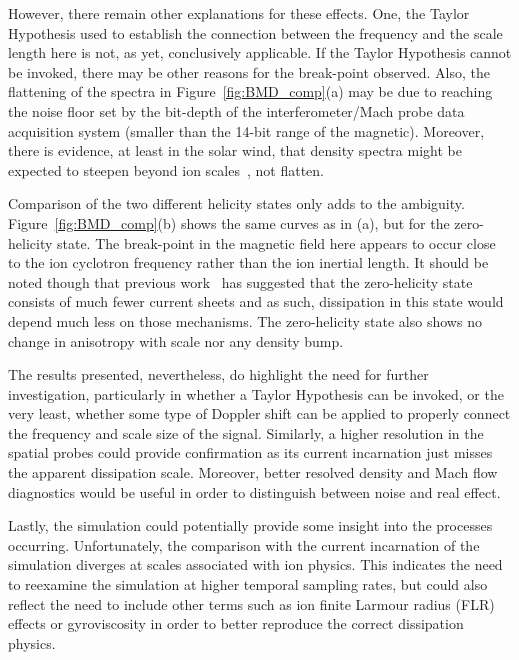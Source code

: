 \documentclass[aip,prl,amsmath,amssymb,reprint,superscriptaddress]{revtex4-1} %
\begin{document}
However, there remain other explanations for these effects. One, the Taylor Hypothesis used to establish the connection between the frequency and the scale length here is not, as yet, conclusively applicable. If the Taylor Hypothesis cannot be invoked, there may be other reasons for the break-point observed. Also, the flattening of the spectra in Figure~\ref{fig:BMD_comp}(a) may be due to reaching the noise floor set by the bit-depth of the interferometer/Mach probe data acquisition system (smaller than the 14-bit range of the magnetic). Moreover, there is evidence, at least in the solar wind, that density spectra might be expected to steepen beyond ion scales~\cite{chen12}, not flatten.

Comparison of the two different helicity states only adds to the ambiguity. Figure~\ref{fig:BMD_comp}(b) shows the same curves as in (a), but for the zero-helicity state. The break-point in the magnetic field here appears to occur close to the ion cyclotron frequency rather than the ion inertial length. It should be noted though that previous work~\cite{schaffner14b} has suggested that the zero-helicity state consists of much fewer current sheets and as such, dissipation in this state would depend much less on those mechanisms. The zero-helicity state also shows no change in anisotropy with scale nor any density bump.

The results presented, nevertheless, do highlight the need for further investigation, particularly in whether a Taylor Hypothesis can be invoked, or the very least, whether some type of Doppler shift can be applied to properly connect the frequency and scale size of the signal. Similarly, a higher resolution in the spatial probes could provide confirmation as its current incarnation just misses the apparent dissipation scale. Moreover, better resolved density and Mach flow diagnostics would be useful in order to distinguish between noise and real effect.

Lastly, the simulation could potentially provide some insight into the processes occurring. Unfortunately, the comparison with the current incarnation of the simulation diverges at scales associated with ion physics. This indicates the need to reexamine the simulation at higher temporal sampling rates, but could also reflect the need to include other terms such as ion finite Larmour radius (FLR) effects or gyroviscosity in order to better reproduce the correct dissipation physics.

\end{document}
